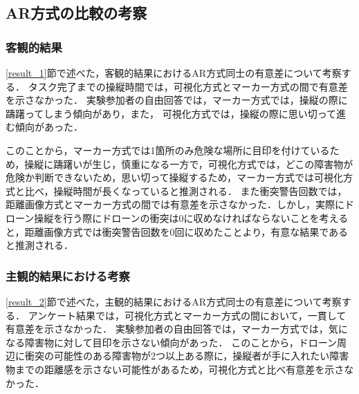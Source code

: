 \documentclass[submit,techrep]{ipsj}
\begin{document}
\subsection{AR方式の比較の考察}
\subsubsection{客観的結果}
\ref{result_1}節で述べた，客観的結果におけるAR方式同士の有意差について考察する．
タスク完了までの操縦時間では，可視化方式とマーカー方式の間で有意差を示さなかった．
実験参加者の自由回答では，マーカー方式では，操縦の際に躊躇ってしまう傾向があり，また，
可視化方式では，操縦の際に思い切って進む傾向があった．

このことから，マーカー方式では1箇所のみ危険な場所に目印を付けているため，操縦に躊躇いが生じ，慎重になる一方で，可視化方式では，どこの障害物が危険か判断できないため，思い切って操縦するため，マーカー方式では可視化方式と比べ，操縦時間が長くなっていると推測される．
また衝突警告回数では，距離画像方式とマーカー方式の間では有意差を示さなかった．しかし，実際にドローン操縦を行う際にドローンの衝突は0に収めなければならないことを考えると，距離画像方式では衝突警告回数を0回に収めたことより，有意な結果であると推測される．

\subsubsection{主観的結果における考察}
\ref{result_2}節で述べた，主観的結果におけるAR方式同士の有意差について考察する．
アンケート結果では，可視化方式とマーカー方式の間において，一貫して有意差を示さなかった．
実験参加者の自由回答では，マーカー方式では，気になる障害物に対して目印を示さない傾向があった．
このことから，ドローン周辺に衝突の可能性のある障害物が2つ以上ある際に，操縦者が手に入れたい障害物までの距離感を示さない可能性があるため，可視化方式と比べ有意差を示さなかった．
\end{document}
